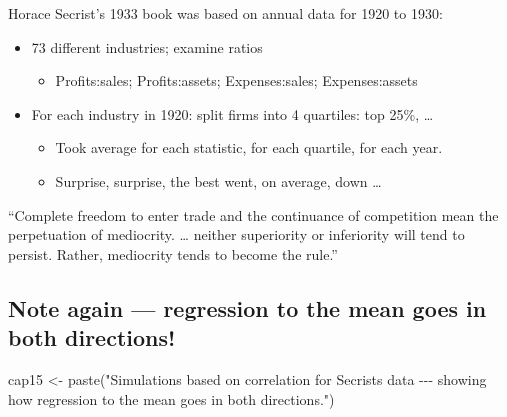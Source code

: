 \documentclass[
  10pt,
  b5paper]{book}
\newenvironment{Shaded}{\begin{snugshade}}{\end{snugshade}}
\newcommand{\FunctionTok}[1]{\textcolor[rgb]{0.00,0.00,0.00}{#1}}
\newcommand{\NormalTok}[1]{#1}
\newcommand{\OtherTok}[1]{\textcolor[rgb]{0.56,0.35,0.01}{#1}}
\newcommand{\StringTok}[1]{\textcolor[rgb]{0.31,0.60,0.02}{#1}}
\providecommand{\tightlist}{%
  \setlength{\itemsep}{0pt}\setlength{\parskip}{0pt}}
\begin{document}
Horace Secrist's 1933 book was based on annual data for 1920 to 1930:

\begin{itemize}
\tightlist
\item
  73 different industries; examine ratios

  \begin{itemize}
  \tightlist
  \item
    Profits:sales; Profits:assets; Expenses:sales; Expenses:assets
  \end{itemize}
\item
  For each industry in 1920: split firms into 4 quartiles: top 25\%, \ldots{}

  \begin{itemize}
  \tightlist
  \item
    Took average for each statistic, for each quartile, for each year.
  \item
    Surprise, surprise, the best went, on average, down \ldots{}
  \end{itemize}
\end{itemize}

``Complete freedom to enter trade and the continuance of competition
mean the perpetuation of mediocrity. \ldots{} neither superiority or
inferiority will tend to persist. Rather, mediocrity tends to become
the rule.''

\hypertarget{note-again-regression-to-the-mean-goes-in-both-directions}{%
\subsection*{Note again --- regression to the mean goes in both directions!}\label{note-again-regression-to-the-mean-goes-in-both-directions}}

\begin{Shaded}
\begin{Highlighting}[]
\NormalTok{cap15 }\OtherTok{\textless{}{-}} \FunctionTok{paste}\NormalTok{(}\StringTok{"Simulations based on correlation for Secrist\textquotesingle{}s data {-}{-}{-} }
\StringTok{               showing how regression to the mean goes in both directions."}\NormalTok{)}
\end{Highlighting}
\end{Shaded}
\end{document}
